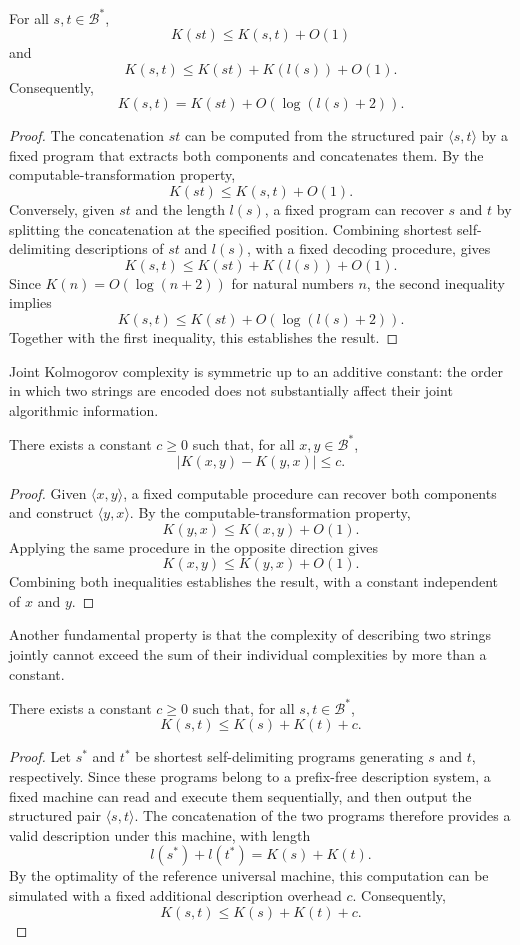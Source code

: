 \begin{proposition}
\label{prop:joint-concatenation}
For all $s,t\in\mathcal{B}^*$,
\[
K(st)\leq K(s,t)+O(1)
\]
and
\[
K(s,t)\leq K(st)+K(l(s))+O(1).
\]
Consequently,
\[
K(s,t)=K(st)+O(\log(l(s)+2)).
\]
\end{proposition}
\begin{proof}
The concatenation $st$ can be computed from the structured pair $\langle s,t\rangle$ by a fixed program that extracts both components and concatenates them. By the computable-transformation property,
\[
K(st)\leq K(s,t)+O(1).
\]
Conversely, given $st$ and the length $l(s)$, a fixed program can recover $s$ and $t$ by splitting the concatenation at the specified position. Combining shortest self-delimiting descriptions of $st$ and $l(s)$, with a fixed decoding procedure, gives
\[
K(s,t)\leq K(st)+K(l(s))+O(1).
\]
Since $K(n)=O(\log(n+2))$ for natural numbers $n$, the second inequality implies
\[
K(s,t)\leq K(st)+O(\log(l(s)+2)).
\]
Together with the first inequality, this establishes the result.
\end{proof}

Joint Kolmogorov complexity is symmetric up to an additive constant: the order in which two strings are encoded does not substantially affect their joint algorithmic information.

\begin{proposition}
\label{prop:kolmogorov_order}
There exists a constant $c\geq 0$ such that, for all
$x,y\in\mathcal{B}^*$,
\[
|K(x,y)-K(y,x)|\leq c.
\]
\end{proposition}
\begin{proof}
Given $\langle x,y\rangle$, a fixed computable procedure can recover both components and construct $\langle y,x\rangle$. By the computable-transformation property,
\[
K(y,x)\leq K(x,y)+O(1).
\]
Applying the same procedure in the opposite direction gives
\[
K(x,y)\leq K(y,x)+O(1).
\]
Combining both inequalities establishes the result, with a constant independent of $x$ and $y$.
\end{proof}

Another fundamental property is that the complexity of describing two strings jointly cannot exceed the sum of their individual complexities by more than a constant.

\begin{proposition}
\label{prop:additive_kolmogorov}
There exists a constant $c\geq 0$ such that, for all
$s,t\in\mathcal{B}^*$,
\[
K(s,t)\leq K(s)+K(t)+c.
\]
\end{proposition}
\begin{proof}
Let $s^*$ and $t^*$ be shortest self-delimiting programs generating $s$ and $t$, respectively. Since these programs belong to a prefix-free description system, a fixed machine can read and execute them sequentially, and then output the structured pair $\langle s,t\rangle$. The concatenation of the two programs therefore provides a valid description under this machine, with length
\[
l(s^*)+l(t^*)=K(s)+K(t).
\]
By the optimality of the reference universal machine, this computation can be simulated with a fixed additional description overhead $c$. Consequently,
\[
K(s,t)\leq K(s)+K(t)+c.
\]
\end{proof}

